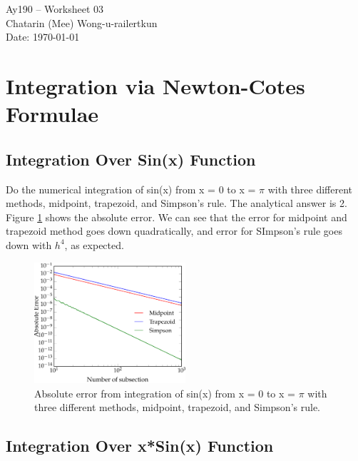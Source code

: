 \documentclass[11pt,letterpaper]{article}
\begin{document}
\begin{center}
\Large
Ay190 -- Worksheet 03 \\    %
Chatarin (Mee) Wong-u-railertkun\\
Date: \today
\end{center}


\section{Integration via Newton-Cotes Formulae}

\subsection{Integration Over Sin(x) Function}

Do the numerical integration of sin(x) from x = 0 to x = $\pi$ with three different methods, midpoint, trapezoid, and Simpson's rule. The analytical answer is 2. Figure \ref{fig:ConvergentA} shows the absolute error. We can see that the error for midpoint and trapezoid method goes down quadratically, and error for SImpson's rule goes down with $h^4$, as expected.

\begin{figure}[h!]
	\centering
	\includegraphics[width=0.5\textwidth]{ConvergentA}
	\caption{Absolute error from integration of sin(x) from x = 0 to x = $\pi$ with three different methods, midpoint, trapezoid, and Simpson's rule.}
	\label{fig:ConvergentA}
\end{figure}

\subsection{Integration Over x*Sin(x) Function}
\end{document}
